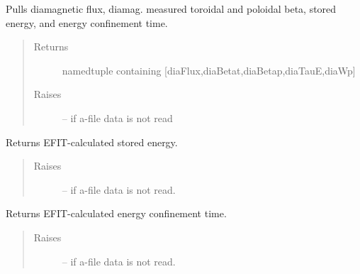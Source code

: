 \documentclass[letterpaper,10pt,english]{sphinxmanual}
\begin{document}
\begin{fulllineitems}
\begin{fulllineitems}
\end{fulllineitems}


\begin{fulllineitems}
\label{eqtools:eqtools.eqdskreader.EqdskReader.getDiamag}
Pulls diamagnetic flux, diamag. measured toroidal and poloidal beta, stored energy, and energy confinement time.
\begin{quote}\begin{description}
\item[{Returns}] \leavevmode
namedtuple containing {[}diaFlux,diaBetat,diaBetap,diaTauE,diaWp{]}

\item[{Raises}] \leavevmode
{} -- 
if a-file data is not read

\end{description}\end{quote}

\end{fulllineitems}


\begin{fulllineitems}
\label{eqtools:eqtools.eqdskreader.EqdskReader.getWMHD}
Returns EFIT-calculated stored energy.
\begin{quote}\begin{description}
\item[{Raises}] \leavevmode
{} -- 
if a-file data is not read.

\end{description}\end{quote}

\end{fulllineitems}


\begin{fulllineitems}
\label{eqtools:eqtools.eqdskreader.EqdskReader.getTauMHD}
Returns EFIT-calculated energy confinement time.
\begin{quote}\begin{description}
\item[{Raises}] \leavevmode
{} -- 
if a-file data is not read.


\end{description}
\end{quote}
\end{fulllineitems}
\end{fulllineitems}
\end{document}
